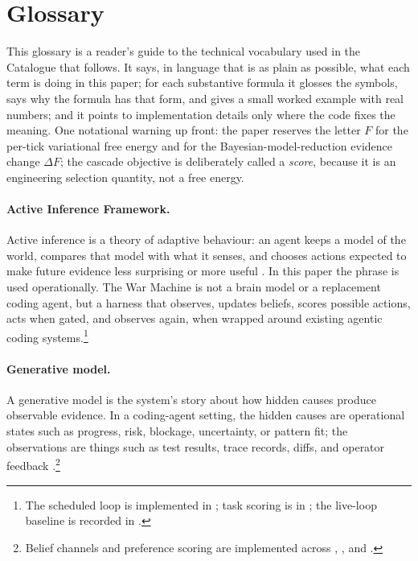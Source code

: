 \section{Glossary}\label{sec:glossary}

This glossary is a reader's guide to the technical vocabulary used in the Catalogue that follows.  It says, in language that is as plain as possible, what each term is doing in this paper; for each substantive formula it glosses the symbols, says why the formula has that form, and gives a small worked example with real numbers; and it points to implementation details only where the code fixes the meaning.  One notational warning up front: the paper reserves the letter $F$ for the per-tick variational free energy and for the Bayesian-model-reduction evidence change $\Delta F$; the cascade objective is deliberately called a \emph{score}, because it is an engineering selection quantity, not a free energy.

\paragraph{Active Inference Framework.} Active inference is a theory of adaptive behaviour: an agent keeps a model of the world, compares that model with what it senses, and chooses actions expected to make future evidence less surprising or more useful \cite{FRISTON2016862,friston2019freeenergyprincipleparticular}.  In this paper the phrase is used operationally.  The War Machine is not a brain model or a replacement coding agent, but a harness that observes, updates beliefs, scores possible actions, acts when gated, and observes again, when wrapped around existing agentic coding systems.\footnote{The scheduled loop is implemented in ; task scoring is in ; the live-loop baseline is recorded in .}

\paragraph{Generative model.} A generative model is the system's story about how hidden causes produce observable evidence.  In a coding-agent setting, the hidden causes are operational states such as progress, risk, blockage, uncertainty, or pattern fit; the observations are things such as test results, trace records, diffs, and operator feedback \cite{FRISTON2016862,neacsu2024structure}.\footnote{Belief channels and preference scoring are implemented across , , and .}

